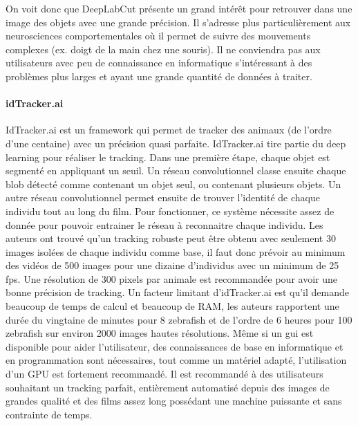   On voit donc que DeepLabCut présente un grand intérêt pour retrouver dans une image des objets avec une grande précision. Il s'adresse plus particulièrement aux neurosciences comportementales où il permet de suivre des mouvements complexes (ex. doigt de la main chez une souris). Il ne conviendra pas aux utilisateurs avec peu de connaissance en informatique s’intéressant à des problèmes plus larges et ayant une grande quantité de données à traiter.

  \paragraph{idTracker.ai}
  IdTracker.ai \cite{romero2019idtracker} est un framework qui permet de tracker des animaux (de l'ordre d'une centaine) avec un précision quasi parfaite. IdTracker.ai tire partie du deep learning pour réaliser le tracking. Dans une première étape, chaque objet est segmenté en appliquant un seuil. Un réseau convolutionnel classe ensuite chaque blob détecté comme contenant un objet seul, ou contenant plusieurs objets. Un autre réseau convolutionnel permet ensuite de trouver l'identité de chaque individu tout au long du film. Pour fonctionner, ce système nécessite assez de donnée pour pouvoir entrainer le réseau à reconnaitre chaque individu. Les auteurs ont trouvé qu'un tracking robuste peut être obtenu avec seulement 30 images isolées de chaque individu comme base, il faut donc prévoir au minimum des vidéos de 500 images pour une dizaine d'individus avec un minimum de 25 fps. Une résolution de 300 pixels par animale est recommandée pour avoir une bonne précision de tracking. Un facteur limitant d'idTracker.ai est qu'il demande beaucoup de temps de calcul et beaucoup de RAM, les auteurs rapportent une durée du vingtaine de minutes pour 8 zebrafish et de l'ordre de 6 heures pour 100 zebrafish sur environ 2000 images hautes résolutions. Même si un gui est disponible pour aider l'utilisateur, des connaissances de base en informatique et en programmation sont nécessaires, tout comme un matériel adapté, l'utilisation d'un GPU est fortement recommandé. Il est recommandé à des utilisateurs souhaitant un tracking parfait, entièrement automatisé depuis des images de grandes qualité et des films assez long possédant une machine puissante et sans contrainte de temps.

